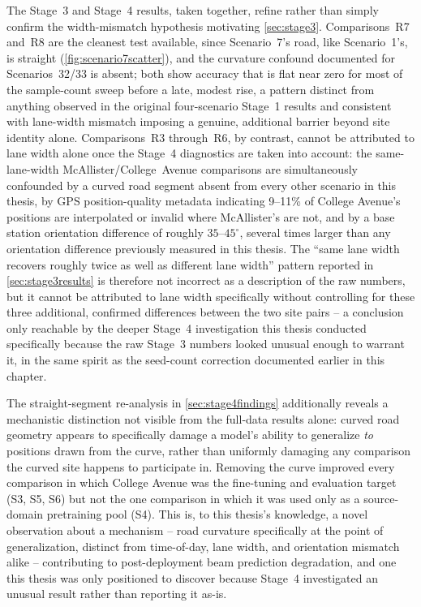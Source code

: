 \documentclass{iutbscthesis}
\begin{document}
The Stage~3 and Stage~4 results, taken together, refine rather than simply confirm the width-mismatch hypothesis motivating \autoref{sec:stage3}. Comparisons~R7 and~R8 are the cleanest test available, since Scenario~7's road, like Scenario~1's, is straight (\autoref{fig:scenario7scatter}), and the curvature confound documented for Scenarios~32/33 is absent; both show accuracy that is flat near zero for most of the sample-count sweep before a late, modest rise, a pattern distinct from anything observed in the original four-scenario Stage~1 results and consistent with lane-width mismatch imposing a genuine, additional barrier beyond site identity alone. Comparisons~R3 through~R6, by contrast, cannot be attributed to lane width alone once the Stage~4 diagnostics are taken into account: the same-lane-width McAllister/College~Avenue comparisons are simultaneously confounded by a curved road segment absent from every other scenario in this thesis, by GPS position-quality metadata indicating 9--11\% of College Avenue's positions are interpolated or invalid where McAllister's are not, and by a base station orientation difference of roughly $35$--$45^\circ$, several times larger than any orientation difference previously measured in this thesis. The ``same lane width recovers roughly twice as well as different lane width'' pattern reported in \autoref{sec:stage3results} is therefore not incorrect as a description of the raw numbers, but it cannot be attributed to lane width specifically without controlling for these three additional, confirmed differences between the two site pairs -- a conclusion only reachable by the deeper Stage~4 investigation this thesis conducted specifically because the raw Stage~3 numbers looked unusual enough to warrant it, in the same spirit as the seed-count correction documented earlier in this chapter.

The straight-segment re-analysis in \autoref{sec:stage4findings} additionally reveals a mechanistic distinction not visible from the full-data results alone: curved road geometry appears to specifically damage a model's ability to generalize \emph{to} positions drawn from the curve, rather than uniformly damaging any comparison the curved site happens to participate in. Removing the curve improved every comparison in which College Avenue was the fine-tuning and evaluation target (S3, S5, S6) but not the one comparison in which it was used only as a source-domain pretraining pool (S4). This is, to this thesis's knowledge, a novel observation about a mechanism -- road curvature specifically at the point of generalization, distinct from time-of-day, lane width, and orientation mismatch alike -- contributing to post-deployment beam prediction degradation, and one this thesis was only positioned to discover because Stage~4 investigated an unusual result rather than reporting it as-is.
\end{document}
